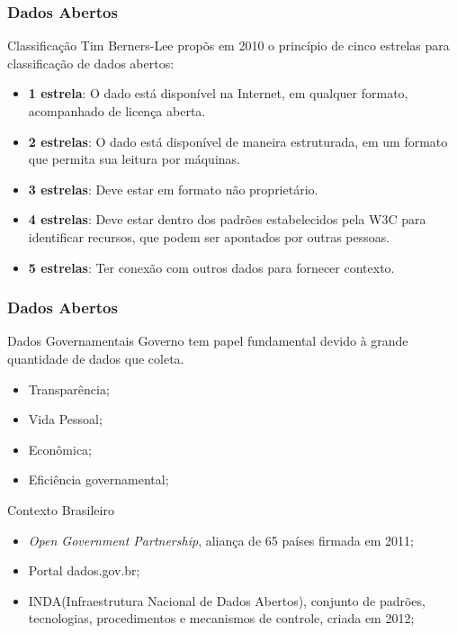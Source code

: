 \documentclass[brazil]{beamer}
\begin{document}
\begin{frame}
	\frametitle{Dados Abertos}

	\begin{block}{Classificação}
		Tim Berners-Lee propõs em 2010 o princípio de cinco estrelas para classificação de dados abertos:
		\begin{itemize}
			\item \textbf{1 estrela}: O dado está disponível na Internet, em qualquer formato, acompanhado de licença aberta.
			\item \textbf{2 estrelas}: O dado está disponível de maneira estruturada, em um formato que permita sua leitura por máquinas.
			\item \textbf{3 estrelas}: Deve estar em formato não proprietário.
			\item \textbf{4 estrelas}: Deve estar dentro dos padrões estabelecidos pela W3C para identificar recursos, que podem ser apontados por outras pessoas. 
			\item \textbf{5 estrelas}: Ter conexão com outros dados para fornecer contexto.
		\end{itemize}
	\end{block}
\end{frame}

\begin{frame}
	\frametitle{Dados Abertos}
	\begin{block}{Dados Governamentais}
		Governo tem papel fundamental devido à grande quantidade de dados que coleta.
		\begin{itemize}
			\item Transparência;
			\item Vida Pessoal;
			\item Econômica;
			\item Eficiência governamental;
		\end{itemize}
	\end{block}
	
	\begin{block}{Contexto Brasileiro}
		\begin{itemize}
			\item \emph{Open Government Partnership}, aliança de 65 países firmada em 2011;
			\item Portal dados.gov.br;
			\item INDA(Infraestrutura Nacional de Dados Abertos), conjunto de padrões, tecnologias, procedimentos e mecanismos de controle, criada em 2012;			
		\end{itemize}
	\end{block}
\end{frame}
\end{document}
